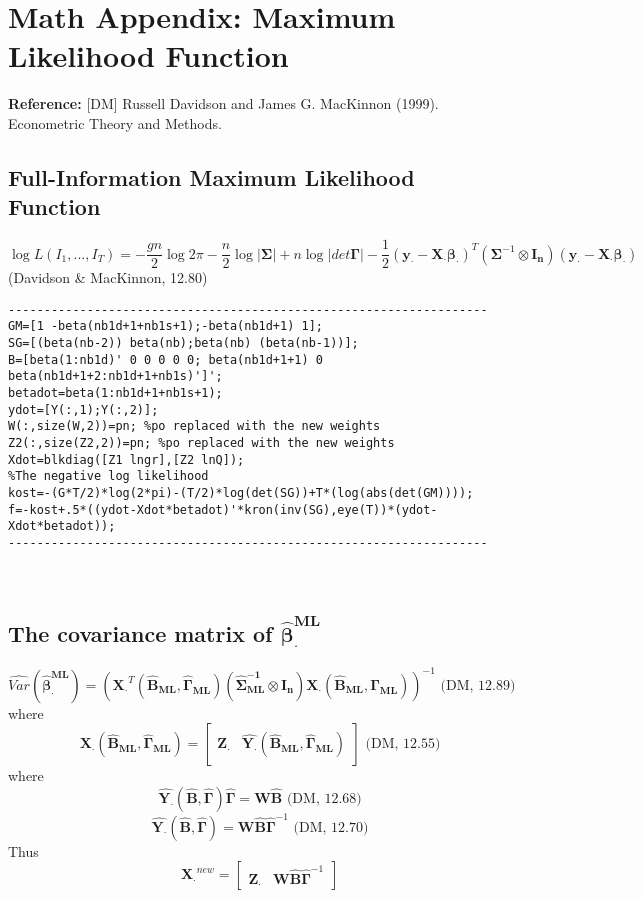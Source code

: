 \documentclass[12pt]{article}
\begin{document}
\section{Math Appendix: Maximum Likelihood Function}

\textbf{Reference:} [DM] Russell Davidson and James G. MacKinnon (1999). Econometric Theory and Methods.

\subsection{Full-Information Maximum Likelihood Function }
\[\log L (I_1,...,I_T) = -\frac{gn}{2}\log 2\pi -\frac{n}{2}\log \left | \bm{\Sigma} \right |  +n\log \left | det \bm{\Gamma} \right | - \frac{1}{2}(\bm{y_\cdot}-\bm{X_\cdot \beta_\cdot})^T(\bm{\Sigma}^{-1}\otimes \bm{I_n})(\bm{y_\cdot}-\bm{X_\cdot \beta_\cdot})\]
(Davidson \& MacKinnon, 12.80)
\lstset{language=Matlab} 
\begin{lstlisting}
-------------------------------------------------------------------
GM=[1 -beta(nb1d+1+nb1s+1);-beta(nb1d+1) 1];
SG=[(beta(nb-2)) beta(nb);beta(nb) (beta(nb-1))]; 
B=[beta(1:nb1d)' 0 0 0 0 0; beta(nb1d+1+1) 0 beta(nb1d+1+2:nb1d+1+nb1s)']';
betadot=beta(1:nb1d+1+nb1s+1);
ydot=[Y(:,1);Y(:,2)];
W(:,size(W,2))=pn; %po replaced with the new weights
Z2(:,size(Z2,2))=pn; %po replaced with the new weights
Xdot=blkdiag([Z1 lngr],[Z2 lnQ]);
%The negative log likelihood
kost=-(G*T/2)*log(2*pi)-(T/2)*log(det(SG))+T*(log(abs(det(GM)))); 
f=-kost+.5*((ydot-Xdot*betadot)'*kron(inv(SG),eye(T))*(ydot-Xdot*betadot)); 
-------------------------------------------------------------------
\end{lstlisting}
\ \ \

\subsection{The covariance matrix of $\bm{\hat{\beta}_\cdot^{ML}}$ }
\[\hat{Var}(\bm{\hat{\beta}_\cdot^{ML}})=(\bm{X_\cdot}^T(\bm{\hat{B}_{ML}},\bm{\hat{\Gamma}_{ML}}) ( \bm{\hat{\Sigma}_{ML}^{-1} \otimes \bm{I_n}  })\bm{X_\cdot} (\bm{\hat{B}_{ML}},\bm{\hat{\Gamma}_{ML}}))^{-1} \text{      (DM, 12.89) }\]
where
\[\bm{X_\cdot} (\bm{\hat{B}_{ML}},\bm{\hat{\Gamma}_{ML}}) = 
\begin{bmatrix}
\bm{Z_\cdot} & \hat{\bm{Y_\cdot}}(\bm{\hat{B}_{ML}},\bm{\hat{\Gamma}_{ML}})
\end{bmatrix} \text{     (DM, 12.55)}\]
where
\[\hat{\bm{Y_\cdot}}(\bm{\hat{B}},\bm{\hat{\Gamma}}) \bm{\hat{\Gamma}} = \bm{W\hat{B}} \text{      (DM, 12.68)}\]
\[\hat{\bm{Y_\cdot}}(\bm{\hat{B}},\bm{\hat{\Gamma}}) = \bm{W\hat{B}} \bm{\hat{\Gamma}} ^{-1} \text{      (DM, 12.70)}\]
Thus
\[\bm{X_\cdot}^{new} = 
\begin{bmatrix}
\bm{Z_\cdot} & \bm{W\hat{B}} \bm{\hat{\Gamma}} ^{-1}
\end{bmatrix}\]
\end{document}

